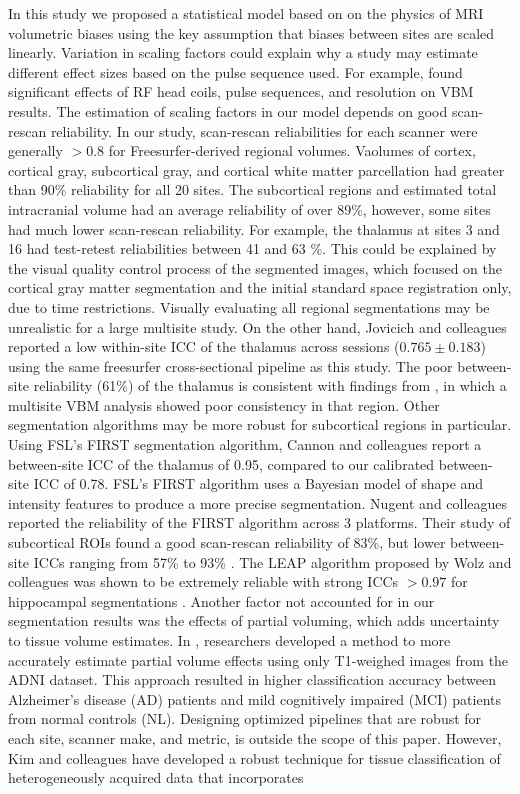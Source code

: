 In this study we proposed a statistical model based on on the physics of MRI volumetric biases using the key assumption that biases between sites are scaled linearly. Variation in scaling factors could explain why a study may estimate different effect sizes based on the pulse sequence used. For example, \cite{streitburger2014impact} found significant effects of RF head coils, pulse sequences, and resolution on VBM results. The estimation of scaling factors in our model depends on good scan-rescan reliability. In our study, scan-rescan reliabilities for each scanner were generally $>0.8$ for Freesurfer-derived regional volumes. Vaolumes of cortex, cortical gray, subcortical gray, and cortical white matter parcellation had greater than 90\% reliability for all 20 sites. The subcortical regions and estimated total intracranial volume had an average reliability of over 89\%, however, some sites had much lower scan-rescan reliability. For example, the thalamus at sites 3 and 16 had test-retest reliabilities between 41 and 63 \%. This could be explained by the visual quality control process of the segmented images, which focused on the cortical gray matter segmentation and the initial standard space registration only, due to time restrictions. Visually evaluating all regional segmentations may be unrealistic for a large multisite study. On the other hand, Jovicich and colleagues \cite{jovicich2013brain} reported a low within-site ICC of the thalamus across sessions ($0.765 \pm 0.183$) using the same freesurfer cross-sectional pipeline as this study. The poor between-site reliability (61\%) of the thalamus is consistent with findings from \cite{schnack2010mapping}, in which a multisite VBM analysis showed poor consistency in that region. Other segmentation algorithms may be more robust for subcortical regions in particular. Using FSL's FIRST segmentation algorithm, Cannon and colleagues \cite{cannon2014} report a between-site ICC of the thalamus of 0.95, compared to our calibrated between-site ICC of 0.78. FSL's FIRST algorithm \cite{firstcitation} uses a Bayesian model of shape and intensity features to produce a more precise segmentation. Nugent and colleagues reported the reliability of the FIRST algorithm across 3 platforms. Their study of subcortical ROIs found a good scan-rescan reliability of 83\%, but lower between-site ICCs ranging from 57\% to 93\% \cite{firstreliability}. The LEAP algorithm proposed by Wolz and colleagues \cite{Wolz_2010} was shown to be extremely reliable with strong ICCs $>0.97$ for hippocampal segmentations \cite{Wolz_2014}. Another factor not accounted for in our segmentation results was the effects of partial voluming, which adds uncertainty to tissue volume estimates. In \cite{Roche_2014}, researchers developed a method to more accurately estimate partial volume effects using only T1-weighed images from the ADNI dataset. This approach resulted in higher classification accuracy between Alzheimer's disease (AD) patients and mild cognitively impaired (MCI) patients from normal controls (NL). Designing optimized pipelines that are robust for each site, scanner make, and metric, is outside the scope of this paper. However, Kim and colleagues have developed a robust technique for tissue classification of heterogeneously acquired data that incorporates 